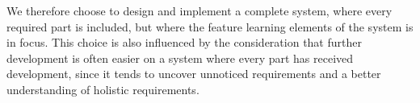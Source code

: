We therefore choose to design and implement a complete system, where every required part is included, but where the feature learning elements of the system is in focus. This choice is also influenced by the consideration that further development is often easier on a system where every part has received development, since it tends to uncover unnoticed requirements and a better understanding of holistic requirements.

